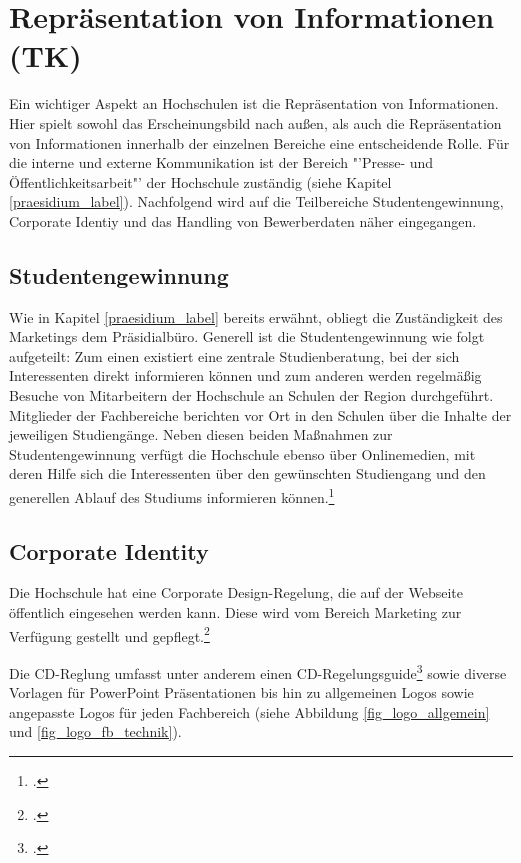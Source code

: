 \section{Repräsentation von Informationen (TK)}
Ein wichtiger Aspekt an Hochschulen ist die Repräsentation von Informationen. Hier spielt sowohl das 
Erscheinungsbild nach außen, als auch die Repräsentation von Informationen innerhalb der einzelnen Bereiche 
eine entscheidende Rolle. Für die interne und externe Kommunikation ist der Bereich "'Presse- und 
Öffentlichkeitsarbeit"' der Hochschule zuständig (siehe Kapitel \ref{praesidium_label}). Nachfolgend wird auf 
die Teilbereiche Studentengewinnung, Corporate Identiy und das Handling von Bewerberdaten näher 
eingegangen.

\subsection{Studentengewinnung}
Wie in Kapitel \ref{praesidium_label} bereits erwähnt, obliegt die Zuständigkeit des Marketings dem 
Präsidialbüro. Generell ist die Studentengewinnung wie folgt aufgeteilt: Zum einen existiert eine zentrale 
Studienberatung, bei der sich Interessenten direkt informieren können und zum anderen werden regelmäßig 
Besuche von Mitarbeitern der Hochschule an Schulen der Region durchgeführt. Mitglieder der Fachbereiche 
berichten vor Ort in den Schulen über die Inhalte der jeweiligen Studiengänge. Neben diesen beiden 
Maßnahmen zur Studentengewinnung verfügt die Hochschule ebenso über Onlinemedien, mit deren Hilfe sich 
die Interessenten über den gewünschten Studiengang und den generellen Ablauf des  Studiums informieren 
können.\footcite{gunter_muller_interview}


\subsection{Corporate Identity}
Die Hochschule hat eine Corporate Design-Regelung, die auf der Webseite öffentlich eingesehen werden 
kann. Diese wird vom Bereich Marketing zur Verfügung gestellt und 
gepflegt.\footcite[Vgl.][]{hsel_CD}

Die CD-Reglung umfasst unter anderem einen 
CD-Regelungsguide\footcite{hsel_CD-manual} sowie diverse Vorlagen für PowerPoint 
Präsentationen bis hin zu allgemeinen Logos sowie angepasste Logos für jeden Fachbereich (siehe Abbildung 
\ref{fig_logo_allgemein} und \ref{fig_logo_fb_technik}).

